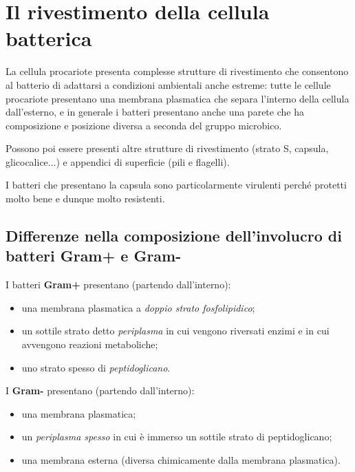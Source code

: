\documentclass[11pt]{book}
\begin{document}
\chapter{Il rivestimento della cellula batterica}

La cellula procariote presenta complesse strutture di rivestimento che consentono al batterio di adattarsi a condizioni ambientali anche estreme: tutte le cellule procariote presentano una membrana plasmatica che separa l'interno della cellula dall'esterno, e in generale i batteri presentano anche una parete che ha composizione e posizione diversa a seconda del gruppo microbico.

Possono poi essere presenti altre strutture di rivestimento (strato S, capsula, glicocalice...) e appendici di superficie (pili e flagelli).

I batteri che presentano la capsula sono particolarmente virulenti perché protetti molto bene e dunque molto resistenti.

\section{Differenze nella composizione dell'involucro di batteri Gram+ e Gram-}
I batteri \textbf{Gram+} presentano (partendo dall'interno):
\begin{itemize}
\item una membrana plasmatica a \emph{doppio strato fosfolipidico};
\item un sottile strato detto \emph{periplasma} in cui vengono riversati enzimi e in cui avvengono reazioni metaboliche;
\item uno strato spesso di \emph{peptidoglicano}.
\end{itemize}

I \textbf{Gram-} presentano (partendo dall'interno):
\begin{itemize}
\item una membrana plasmatica;
\item un \emph{periplasma spesso} in cui è immerso un sottile strato di peptidoglicano;
\item una membrana esterna (diversa chimicamente dalla membrana plasmatica).
\end{itemize}
\end{document}

